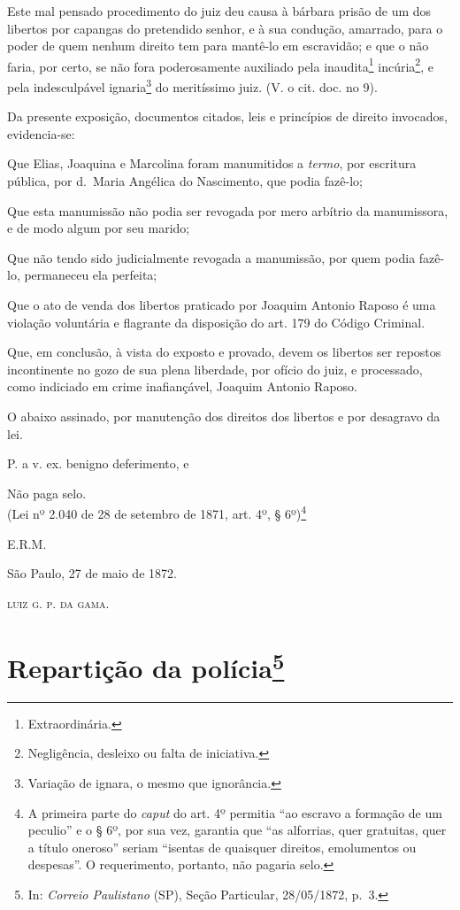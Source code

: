 {Este mal pensado procedimento do juiz deu causa à bárbara prisão de um
dos libertos por capangas do pretendido senhor, e à sua condução,
amarrado, para o poder de quem nenhum direito tem para mantê-lo em
escravidão; e que o não faria, por certo, se não fora poderosamente
auxiliado pela inaudita\footnote{ Extraordinária.} incúria\footnote{
  Negligência, desleixo ou falta de iniciativa.}, e pela indesculpável
ignaria\footnote{ Variação de ignara, o mesmo que ignorância.} do
meritíssimo juiz. (V. o cit. doc. no 9).

Da presente exposição, documentos citados, leis e princípios de direito
invocados, evidencia-se:

Que Elias, Joaquina e Marcolina foram manumitidos a \emph{termo}, por
escritura pública, por d.~Maria Angélica do Nascimento, que podia
fazê-lo;

Que esta manumissão não podia ser revogada por mero arbítrio da
manumissora, e de modo algum por seu marido;

Que não tendo sido judicialmente revogada a manumissão, por quem podia
fazê-lo, permaneceu ela perfeita;

Que o ato de venda dos libertos praticado por Joaquim Antonio Raposo é
uma violação voluntária e flagrante da disposição do art. 179 do Código
Criminal.

Que, em conclusão, à vista do exposto e provado, devem os libertos ser
repostos incontinente no gozo de sua plena liberdade, por ofício do
juiz, e processado, como indiciado em crime inafiançável, Joaquim
Antonio Raposo.

O abaixo assinado, por manutenção dos direitos dos libertos e por
desagravo da lei.

P. a v. ex. benigno deferimento, e

Não paga selo.\\
(Lei nº 2.040 de 28 de setembro de 1871, art. 4º, § 6º)\footnote{ A
  primeira parte do \emph{caput} do art. 4º permitia ``ao escravo a
  formação de um peculio'' e o § 6º, por sua vez, garantia que ``as
  alforrias, quer gratuitas, quer a título oneroso'' seriam ``isentas de
  quaisquer direitos, emolumentos ou despesas''. O requerimento,
  portanto, não pagaria selo.}

E.R.M.
\begin{flushright}
São Paulo, 27 de maio de 1872.

\textsc{luiz g. p. da gama}.
\end{flushright}
\chapter{Repartição da polícia\footnote{ In: \emph{Correio Paulistano} (SP), Seção Particular,
  28/05/1872, p.~3.}} %

}
